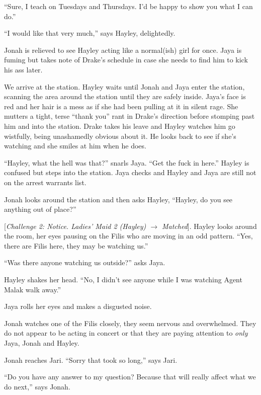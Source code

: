 ``Sure, I teach on Tuesdays and Thursdays. I'd be happy to show you what I can do.''

``I would like that very much,'' says Hayley, delightedly.

Jonah is relieved to see Hayley acting like a normal(ish) girl for once.  Jaya is fuming but takes note of Drake's schedule in case she needs to find him to kick his ass later.





We arrive at the station.  Hayley waits until Jonah and Jaya enter the station, scanning the area around the station until they are safely inside.  Jaya's face is red and her hair is a mess as if she had been pulling at it in silent rage.  She mutters a tight, terse ``thank you'' rant in Drake's direction before stomping past him and into the station. Drake takes his leave and Hayley watches him go wistfully, being unashamedly obvious about it.  He looks back to see if she's watching and she smiles at him when he does.  



``Hayley, what the hell was that?'' snarls Jaya.  ``Get the fuck in here.''  Hayley is confused but steps into the station.  Jaya checks and Hayley and Jaya are still not on the arrest warrants list.



Jonah looks around the station and then asks Hayley, ``Hayley, do you see anything out of place?''

{[}\textit{Challenge 2: Notice.  Ladies' Maid 2 (Hayley) $\rightarrow$ Matched}{]}.  Hayley looks around the room, her eyes pausing on the Filis who are moving in an odd pattern.  ``Yes, there are Filis here, they may be watching us.''

``Was there anyone watching us outside?'' asks Jaya.

Hayley shakes her head.  ``No, I didn't see anyone while I was watching Agent Malak walk away.''

Jaya rolls her eyes and makes a disgusted noise.

Jonah watches one of the Filis closely, they seem nervous and overwhelmed.  They do not appear to be acting in concert or that they are paying attention to \textit{only} Jaya, Jonah and Hayley.



Jonah reaches Jari.  ``Sorry that took so long,'' says Jari.

``Do you have any answer to my question?  Because that will really affect what we do next,'' says Jonah.  

